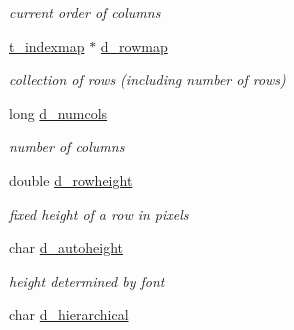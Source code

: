 \begin{DoxyCompactItemize}
\begin{DoxyCompactList}\small\item\em current order of columns \item\end{DoxyCompactList}\item 
\hypertarget{structt__jdataview_a16a76a7a04f7f5ccd1a0176a5321f4bf}{
\hyperlink{structt__indexmap}{t\_\-indexmap} $\ast$ \hyperlink{structt__jdataview_a16a76a7a04f7f5ccd1a0176a5321f4bf}{d\_\-rowmap}}
\label{structt__jdataview_a16a76a7a04f7f5ccd1a0176a5321f4bf}

\begin{DoxyCompactList}\small\item\em collection of rows (including number of rows) \item\end{DoxyCompactList}\item 
\hypertarget{structt__jdataview_a86e55c21b1d0b4322c88f0d7713d50aa}{
long \hyperlink{structt__jdataview_a86e55c21b1d0b4322c88f0d7713d50aa}{d\_\-numcols}}
\label{structt__jdataview_a86e55c21b1d0b4322c88f0d7713d50aa}

\begin{DoxyCompactList}\small\item\em number of columns \item\end{DoxyCompactList}\item 
\hypertarget{structt__jdataview_a11092227711435816f53d732e481847a}{
double \hyperlink{structt__jdataview_a11092227711435816f53d732e481847a}{d\_\-rowheight}}
\label{structt__jdataview_a11092227711435816f53d732e481847a}

\begin{DoxyCompactList}\small\item\em fixed height of a row in pixels \item\end{DoxyCompactList}\item 
\hypertarget{structt__jdataview_af5abbaf9f0d3b1d383c6049aceaa269b}{
char \hyperlink{structt__jdataview_af5abbaf9f0d3b1d383c6049aceaa269b}{d\_\-autoheight}}
\label{structt__jdataview_af5abbaf9f0d3b1d383c6049aceaa269b}

\begin{DoxyCompactList}\small\item\em height determined by font \item\end{DoxyCompactList}\item 
\hypertarget{structt__jdataview_ab3ad1cf1c6bdbc78a9f69edb014fa3eb}{
char \hyperlink{structt__jdataview_ab3ad1cf1c6bdbc78a9f69edb014fa3eb}{d\_\-hierarchical}}
\label{structt__jdataview_ab3ad1cf1c6bdbc78a9f69edb014fa3eb}


\end{DoxyCompactItemize}
